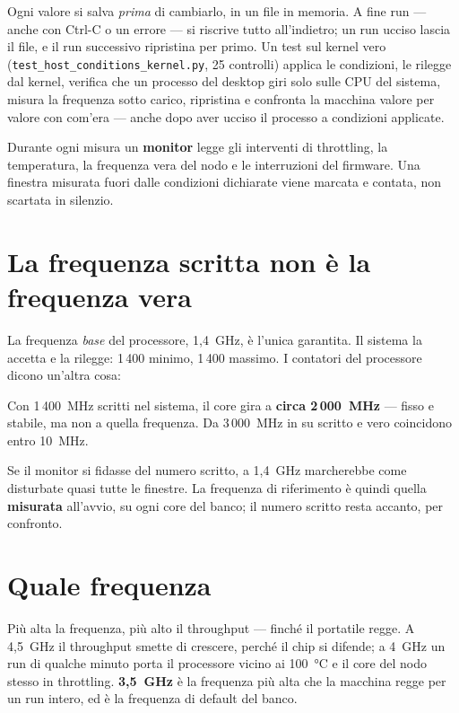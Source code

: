 \documentclass[11pt,a4paper,oneside]{report}
\begin{document}
Ogni valore si salva \emph{prima} di cambiarlo, in un file in memoria. A fine run
--- anche con Ctrl-C o un errore --- si riscrive tutto all'indietro; un run ucciso
lascia il file, e il run successivo ripristina per primo. Un test sul kernel vero
(\texttt{test\_host\_conditions\_kernel.py}, 25 controlli) applica le condizioni, le rilegge
dal kernel, verifica che un processo del desktop giri solo sulle CPU del sistema,
misura la frequenza sotto carico, ripristina e confronta la macchina valore per
valore con com'era --- anche dopo aver ucciso il processo a condizioni applicate.

Durante ogni misura un \textbf{monitor} legge gli interventi di throttling, la
temperatura, la frequenza vera del nodo e le interruzioni del firmware. Una
finestra misurata fuori dalle condizioni dichiarate viene marcata e contata, non
scartata in silenzio.

\section{La frequenza scritta non è la frequenza vera}

La frequenza \emph{base} del processore, 1,4~GHz, è l'unica garantita. Il sistema
la accetta e la rilegge: 1\,400 minimo, 1\,400 massimo. I contatori del
processore dicono un'altra cosa:

\begin{lezione}
Con 1\,400~MHz scritti nel sistema, il core gira a \textbf{circa 2\,000~MHz} ---
fisso e stabile, ma non a quella frequenza. Da 3\,000~MHz in su scritto e vero
coincidono entro 10~MHz.
\end{lezione}

Se il monitor si fidasse del numero scritto, a 1,4~GHz marcherebbe come
disturbate quasi tutte le finestre. La frequenza di riferimento è quindi quella
\textbf{misurata} all'avvio, su ogni core del banco; il numero scritto resta
accanto, per confronto.

\section{Quale frequenza}

Più alta la frequenza, più alto il throughput --- finché il portatile regge. A
4,5~GHz il throughput smette di crescere, perché il chip si difende; a 4~GHz un
run di qualche minuto porta il processore vicino ai 100~°C e il core del nodo
stesso in throttling. \textbf{3,5~GHz} è la frequenza più alta che la macchina
regge per un run intero, ed è la frequenza di default del banco.
\end{document}
